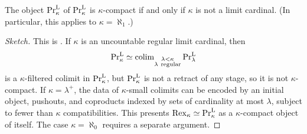 \documentclass[11pt]{book}
\begin{document}
	\begin{proposition}
		The object $\textup{Pr}^{\textup{L}}_{\kappa}$ of $\textup{Pr}^{\textup{L}}_{\kappa}$ is $\kappa$-compact if and only if $\kappa$ is not a limit cardinal. (In particular, this applies to $\kappa = \aleph_1$.)
	\end{proposition}
	\begin{proof}[Sketch]
		This is \cite[Proposition 2.11]{Scholze_Gestalten}. If $\kappa$ is an uncountable regular limit cardinal, then
		\[
			\textup{Pr}^{\textup{L}}_{\kappa} \simeq \operatorname{colim}_{\substack{\lambda < \kappa \\ \lambda\ \mathrm{regular}}} \textup{Pr}^{\textup{L}}_{\lambda}
		\]
		is a $\kappa$-filtered colimit in $\textup{Pr}^{\textup{L}}_{\kappa}$, but $\textup{Pr}^{\textup{L}}_{\kappa}$ is not a retract of any stage, so it is not $\kappa$-compact. If $\kappa = \lambda^+$, the data of $\kappa$-small colimits can be encoded by an initial object, pushouts, and coproducts indexed by sets of cardinality at most $\lambda$, subject to fewer than $\kappa$ compatibilities. This presents $\operatorname{Rex}_{\kappa} \simeq \textup{Pr}^{\textup{L}}_{\kappa}$ as a $\kappa$-compact object of itself. The case $\kappa = \aleph_0$ requires a separate argument.
	\end{proof}
\end{document}
